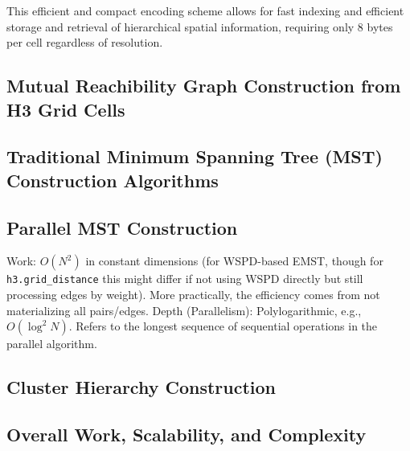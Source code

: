This efficient and compact encoding scheme allows for fast indexing and efficient storage and retrieval of hierarchical spatial information, requiring only 8 bytes per cell regardless of resolution.

\lipsum[1]
\subsection{Mutual Reachibility Graph Construction from H3 Grid Cells}
\lipsum[1-3]

\subsection{Traditional Minimum Spanning Tree (MST) Construction Algorithms}

\subsection{Parallel MST Construction}
 Work: $O(N^2)$ in constant dimensions (for WSPD-based EMST, though for \texttt{h3.grid\_distance} this might differ if not using WSPD directly but still processing edges by weight). More practically, the efficiency comes from not materializing all pairs/edges.
Depth (Parallelism): Polylogarithmic, e.g., $O(\log^2 N)$. Refers to the longest sequence of sequential operations in the parallel algorithm. 

\subsection{Cluster Hierarchy Construction}


\subsection{Overall Work, Scalability, and Complexity}


